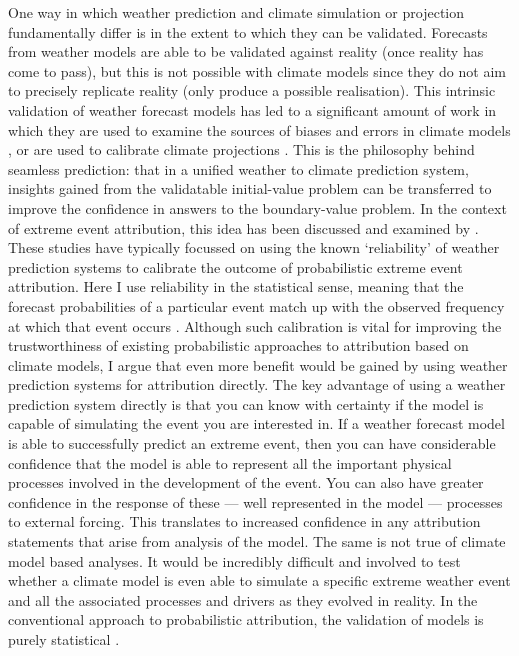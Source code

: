     One way in which weather prediction and climate simulation or projection fundamentally differ is in the extent to which they can be validated. Forecasts from weather models are able to be validated against reality (once reality has come to pass), but this is not possible with climate models since they do not aim to precisely replicate reality (only produce a possible realisation). This intrinsic validation of weather forecast models has led to a significant amount of work in which they are used to examine the sources of biases and errors in climate models \citep{williams_transpose-amip_2013}, or are used to calibrate climate projections \citep{palmer_toward_2008,matsueda_calibrating_2016}. This is the philosophy behind seamless prediction: that in a unified weather to climate prediction system, insights gained from the validatable initial-value problem can be transferred to improve the confidence in answers to the boundary-value problem. In the context of extreme event attribution, this idea has been discussed and examined by \citet{weisheimer_atmospheric_2017,palmer_simple_2018,lott_evaluating_2016,bellprat_attribution_2016,bellprat_towards_2019}. These studies have typically focussed on using the known `reliability' of weather prediction systems to calibrate the outcome of probabilistic extreme event attribution. Here I use reliability in the statistical sense, meaning that the forecast probabilities of a particular event match up with the observed frequency at which that event occurs \citep{weisheimer_reliability_2014}. Although such calibration is vital for improving the trustworthiness of existing probabilistic approaches to attribution based on climate models, I argue that even more benefit would be gained by using weather prediction systems for attribution directly. The key advantage of using a weather prediction system directly is that you can know with certainty if the model is capable of simulating the event you are interested in. If a weather forecast model is able to successfully predict an extreme event, then you can have considerable confidence that the model is able to represent all the important physical processes involved in the development of the event. You can also have greater confidence in the response of these --- well represented in the model --- processes to external forcing. This translates to increased confidence in any attribution statements that arise from analysis of the model. The same is not true of climate model based analyses. It would be incredibly difficult and involved to test whether a climate model is even able to simulate a specific extreme weather event and all the associated processes and drivers as they evolved in reality. In the conventional approach to probabilistic attribution, the validation of models is purely statistical \citep{philip_protocol_2020}.

